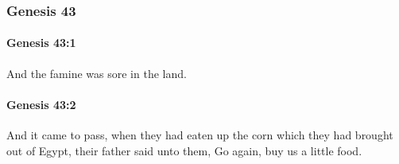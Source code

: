 	\subsubsection{Genesis 43} %
		\label{GENESIS-43}

		\paragraph{Genesis 43:1} %
			\label{GENESIS-43-1}

			And the famine was sore in the land.


		\paragraph{Genesis 43:2} %
			\label{GENESIS-43-2}

			And it came to pass, when they had eaten up the corn which they had brought out of Egypt, their father said unto them, Go again, buy us a little food.

